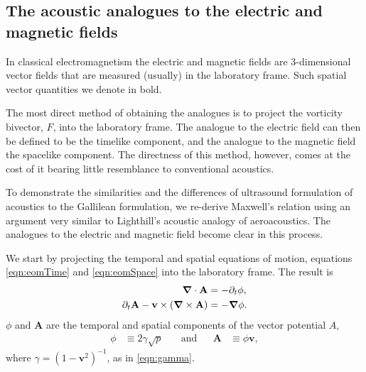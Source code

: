 \documentclass[10pt, fleqn,final,showtrims,oldfontcommands]{article} %
\newcommand{\sub}[1]{\begin{subequations}#1\end{subequations}}
\newcommand{\eqnref}[1]{\ref{eqn:#1}}
\newcommand{\lr}[1]{\left( #1 \right)}
\renewcommand{\d}{\partial}
\newcommand{\del}{\nabla}
\newcommand{\vdel}{ \mbox{\boldmath $\del$}}
\newcommand{\dt}{{\d_t}}
\newcommand{\g}{\gamma_0}
\newcommand{\vA}{\textbf{A}}
\newcommand{\vv}{\textbf{v}}
\begin{document}





\subsection{The acoustic analogues to the electric and magnetic fields}\label{sec:int:EM}

In classical electromagnetism the electric and magnetic fields are 
3-dimensional vector fields that are measured (usually) in the laboratory frame.
Such spatial vector quantities we denote in bold.

The most direct method of obtaining the analogues  is to project the vorticity bivector, $F$, into the laboratory  frame\cite{Hestenes2003, Doran2003}.
The analogue to the electric field can then be defined to be the timelike component, and the analogue to the magnetic field the spacelike component.
The directness of this method, however, comes at the cost of it bearing little  resemblance to conventional acoustics.

To demonstrate the similarities and the differences of ultrasound formulation of acoustics  to the Gallilean formulation,
we re-derive Maxwell's relation using an argument very similar to Lighthill's acoustic analogy\cite{Lighthill1952} of aeroacoustics.
The analogues to the electric and magnetic field  become clear in this process.

We start  by projecting the temporal and spatial equations of motion, equations \eqnref{eomTime} and \eqnref{eomSpace}
into the laboratory frame.
The result is
\sub{
  \begin{align}
     \vdel \cdot \vA &=  - \dt \phi, \label{eqn:Rcontinuity}\\ %
\dt \vA - \vv \times  \lr{\vdel \times \vA} \label{eqn:REuler}
&= - \vdel \phi.
  \end{align}
}
$\phi$ and $\vA$ are the temporal and spatial components of the vector potential $A$,
\begin{align}
\phi &\equiv  2\gamma \sqrt {p}   %
& \quad\text{and} &&
\vA &\equiv  \phi \vv,  %
 \end{align}
where $\gamma = (1-\vv^2)^{-1}$, as in \eqnref{gamma}.
\end{document}
